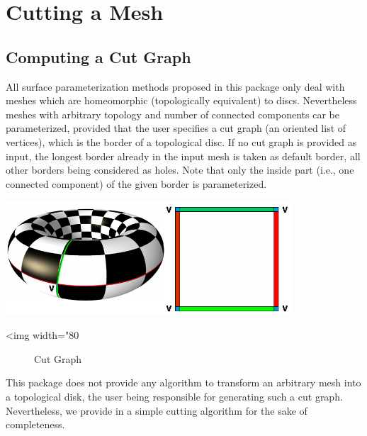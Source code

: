 \section{Cutting a Mesh}
\label{sec:Cutting-a-Mesh}

\subsection{Computing a Cut Graph}

All surface parameterization methods proposed in this package only
deal with meshes which are homeomorphic (topologically equivalent) to discs.
Nevertheless meshes with arbitrary topology and number of connected components car be parameterized, provided that the user specifies a cut graph (an oriented list of vertices), which is the border of a topological disc. If no cut graph is
provided as input, the longest border already
in the input mesh is taken as default border, all other borders being considered as holes. Note that only the inside part (i.e., one connected component) of the given border is parameterized.

\begin{center}
    \label{Surface_mesh_parameterization-fig-cut}
    \begin{ccTexOnly}
        \includegraphics[width=0.8\textwidth]{Surface_mesh_parameterization/cut}
    \end{ccTexOnly}
    \begin{ccHtmlOnly}
        <img width="80%
    \end{ccHtmlOnly}
    \begin{figure}[h]
        \caption{Cut Graph}
    \end{figure}
\end{center}

This package does not provide any algorithm to transform an arbitrary mesh
into a topological disk, the user being responsible
for generating such a cut graph. Nevertheless, we provide in
 a simple cutting algorithm for
the sake of completeness.


